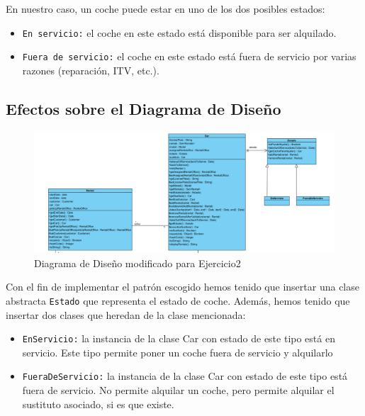 En nuestro caso, un coche puede estar en uno de los dos posibles estados:

\begin{itemize}
    \item \texttt{En servicio:} el coche en este estado está disponible para ser alquilado. 
    \item \texttt{Fuera de servicio:} el coche en este estado está fuera de servicio por varias razones (reparación, ITV, etc.).
    
\end{itemize}



\subsection{Efectos sobre el Diagrama de Diseño}
\begin{figure}[H]
    \centering
     \includegraphics[width=1.0\linewidth]{assets/diagramas/UML_Apartado2.png}
     \caption{Diagrama de Diseño modificado para Ejercicio2}
\end{figure}

Con el fin de implementar el patrón escogido hemos tenido que insertar una clase abstracta \texttt{Estado}
que representa el estado de coche.
Además, hemos tenido que insertar dos clases que heredan de la clase mencionada: 
\begin{itemize}
    \item \texttt{EnServicio:} la instancia de la clase Car con estado de este tipo está en servicio. Este tipo permite poner un
                            coche fuera de servicio y alquilarlo
    \item \texttt{FueraDeServicio:} la instancia de la clase Car con estado de este tipo está fuera de servicio. No permite alquilar un coche, pero permite
                            alquilar el sustituto asociado, si es que existe.
    
\end{itemize}


